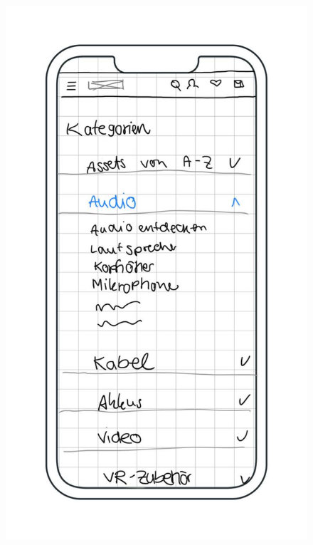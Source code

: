 \begin{figure}[h]
    \centering
    \includegraphics[scale=0.37]{Bilder/Mockups/Kategorien.jpg}

\end{figure}
